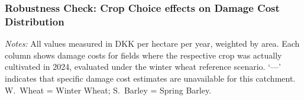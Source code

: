 \documentclass[12pt]{article}
\begin{document}
\subsubsection{Robustness Check: Crop Choice effects on Damage Cost Distribution}


\begin{table}[H]
\centering
\small
\caption{Area-weighted average damage cost in DKK/ha/y by crop type actually
cultivated, under the winter wheat reference scenario.}
\label{tab:dc_crop_short}
\begin{tablenotes}
\footnotesize
\item \textit{Notes:} All values measured in DKK per hectare per year, weighted by
area. Each column shows damage costs for fields where the respective crop was actually
cultivated in 2024, evaluated under the winter wheat reference scenario. `---' indicates
that specific damage cost estimates are unavailable for this catchment.
W.~Wheat = Winter Wheat; S.~Barley = Spring Barley.
\end{tablenotes}
\end{table}
\end{document}
